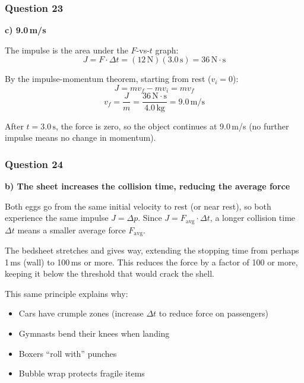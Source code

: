 \documentclass[12pt,letterpaper]{article}
\begin{document}
\subsubsection*{Question 23}

\begin{answerbox}
\textbf{c) 9.0\,m/s}
\end{answerbox}

\begin{explanationbox}
The impulse is the area under the $F$-vs-$t$ graph:
\[
J = F \cdot \Delta t = (12\,\text{N})(3.0\,\text{s}) = 36\,\text{N}\cdot\text{s}
\]

By the impulse-momentum theorem, starting from rest ($v_i = 0$):
\[
J = m v_f - m v_i = m v_f
\]
\[
v_f = \frac{J}{m} = \frac{36\,\text{N}\cdot\text{s}}{4.0\,\text{kg}} = 9.0\,\text{m/s}
\]

After $t = 3.0\,\text{s}$, the force is zero, so the object continues at 9.0\,m/s (no further impulse means no change in momentum).
\end{explanationbox}

\subsubsection*{Question 24}

\begin{answerbox}
\textbf{b) The sheet increases the collision time, reducing the average force}
\end{answerbox}

\begin{explanationbox}
Both eggs go from the same initial velocity to rest (or near rest), so both experience the same impulse $J = \Delta p$. Since $J = F_{\text{avg}} \cdot \Delta t$, a longer collision time $\Delta t$ means a smaller average force $F_{\text{avg}}$.

The bedsheet stretches and gives way, extending the stopping time from perhaps 1\,ms (wall) to 100\,ms or more. This reduces the force by a factor of 100 or more, keeping it below the threshold that would crack the shell.

This same principle explains why:
\begin{itemize}
\item Cars have crumple zones (increase $\Delta t$ to reduce force on passengers)
\item Gymnasts bend their knees when landing
\item Boxers ``roll with'' punches
\item Bubble wrap protects fragile items
\end{itemize}
\end{explanationbox}
\end{document}

